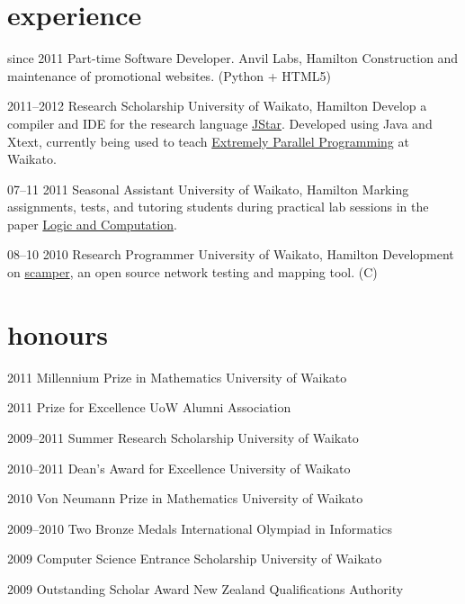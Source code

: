 \documentclass[]{friggeri-cv}
\begin{document}
\section{experience}

\begin{entrylist}
  \entry
    {since 2011}
    {Part-time Software Developer.}
    {Anvil Labs, Hamilton}
    {Construction and maintenance of promotional websites. (Python + HTML5)}

  \entry
    {2011--2012}
    {Research Scholarship}
    {University of Waikato, Hamilton}
    {Develop a compiler and IDE for the research language
    \href{http://www.cs.waikato.ac.nz/research/jstar/}{JStar}.
    Developed using Java and Xtext, currently being used to teach
    \href{http://papers.waikato.ac.nz/subjects/COMP/COMP553}
    {Extremely Parallel Programming} at Waikato.}

  \entry
    {07--11 2011}
    {Seasonal Assistant}
    {University of Waikato, Hamilton}
    {Marking assignments, tests, and tutoring students during
    practical lab sessions in the paper
    \href{http://papers.waikato.ac.nz/subjects/COMP/COMP235}
    {Logic and Computation}.}

  \entry
    {08--10 2010}
    {Research Programmer}
    {University of Waikato, Hamilton}
    {Development on
    \href{http://www.wand.net.nz/scamper}{scamper},
    an open source network testing and mapping tool. (C)}
\end{entrylist}

\section{honours}
\begin{entrylist}
  \titleentry
    {2011}
    {Millennium Prize in Mathematics}
    {University of Waikato}

  \titleentry
    {2011}
    {Prize for Excellence}
    {UoW Alumni Association}

  \titleentry
    {2009--2011}
    {Summer Research Scholarship}
    {University of Waikato}

  \titleentry
    {2010--2011}
    {Dean's Award for Excellence}
    {University of Waikato}

  \titleentry
    {2010}
    {Von Neumann Prize in Mathematics}
    {University of Waikato}

  \titleentry
    {2009--2010}
    {Two Bronze Medals}
    {International Olympiad in Informatics}

  \titleentry
    {2009}
    {Computer Science Entrance Scholarship}
    {University of Waikato}

  \titleentry
    {2009}
    {Outstanding Scholar Award}
    {New Zealand Qualifications Authority}
\end{entrylist}
\end{document}
